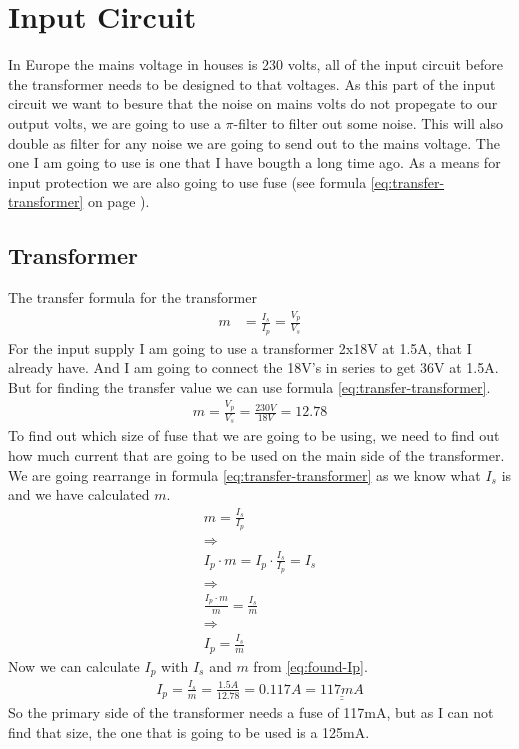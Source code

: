 \section{Input Circuit}
In Europe the mains voltage in houses is 230 volts, all of the input circuit before the transformer needs to be designed to that voltages. 
As this part of the input circuit we want to besure that the noise on mains volts do not propegate to our output volts, we are going to use a $\pi$-filter to filter out some noise. This will also double as filter for any noise we are going to send out to the mains voltage. The one I am going to use is one that I have bougth a long time ago. As a means for input protection we are also going to use fuse (see formula \ref{eq:transfer-transformer} on page \pageref{eq:transfer-transformer}).

\subsection{Transformer}
The transfer formula for the transformer 
\begin{align}\label{eq:transfer-transformer}
m &= \frac{I_s}{I_p} = \frac{V_p}{V_s}
\end{align}
For the input supply I am going to use a transformer 2x18V at 1.5A, that I already have. And I am going to connect the 18V's in series to get 36V at 1.5A. But for finding the transfer value we can use formula \ref{eq:transfer-transformer}.
\begin{align}
m = \frac{V_p}{V_s} = \frac{230V}{18V} = 12.78 \nonumber
\end{align}
 To find out which size of fuse that we are going to be using, we need to find out how much current that are going to be used on the main side of the transformer.
We are going rearrange in formula \ref{eq:transfer-transformer} as we know what $I_s$ is and we have calculated $m$.
\begin{align}
m = \frac{I_s}{I_p} \nonumber \\
\Rightarrow \nonumber \\
I_p \cdot m = I_p \cdot \frac{I_s}{I_p} = I_s \nonumber \\
\Rightarrow \nonumber \\
\frac{ I_p \cdot m}{m} = \frac{I_s}{m} \nonumber \\
\Rightarrow \nonumber \\
I_p = \frac{I_s}{m} \label{eq:found-Ip}
\end{align}
Now we can calculate $I_p$ with $I_s$ and $m$ from \ref{eq:found-Ip}.
\begin{align}
I_p = \frac{I_s}{m} = \frac{1.5A}{12.78} = 0.117A = \underline{\underline{117mA}} \nonumber 
\end{align}
So the primary side of the transformer needs a fuse of 117mA, but as I can not find that size, the one that is going to be used is a 125mA.

